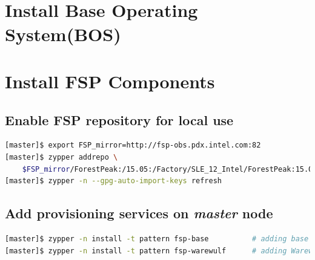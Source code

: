 \documentclass[letterpaper]{article}
\begin{document}
 \\

 \\




\section{Install Base Operating System(BOS)}



\section{Install FSP Components} \label{sec:basic_install}


\subsection{Enable FSP repository for local use}


\begin{lstlisting}[language=bash,keywords={}]
[master]$ export FSP_mirror=http://fsp-obs.pdx.intel.com:82
[master]$ zypper addrepo \
    $FSP_mirror/ForestPeak:/15.05:/Factory/SLE_12_Intel/ForestPeak:15.05:Factory.repo
[master]$ zypper -n --gpg-auto-import-keys refresh
\end{lstlisting}


\subsection{Add provisioning services on {\em master} node}


\begin{lstlisting}[language=bash,keywords={}]
[master]$ zypper -n install -t pattern fsp-base          # adding base FSP packages
[master]$ zypper -n install -t pattern fsp-warewulf      # adding Warewulf support
\end{lstlisting}
\end{document}
